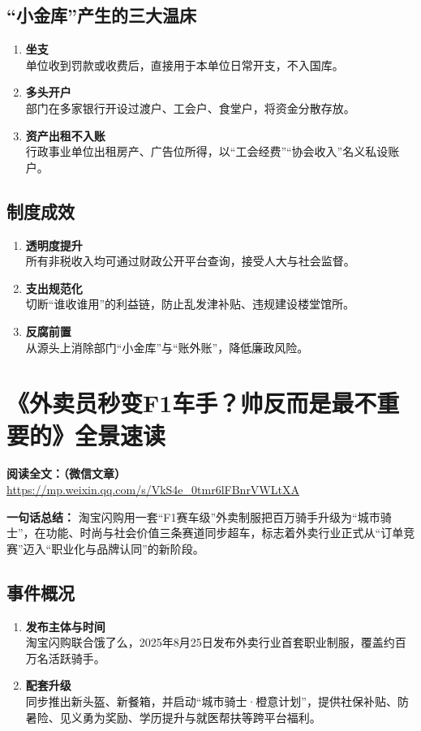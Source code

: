 \subsection{“小金库”产生的三大温床}
\begin{enumerate}[leftmargin=*, nosep]
    \item \textbf{坐支}  \\
    单位收到罚款或收费后，直接用于本单位日常开支，不入国库。
    \item \textbf{多头开户}  \\
    部门在多家银行开设过渡户、工会户、食堂户，将资金分散存放。
    \item \textbf{资产出租不入账}  \\
    行政事业单位出租房产、广告位所得，以“工会经费”“协会收入”名义私设账户。
\end{enumerate}

\subsection{制度成效}
\begin{enumerate}[leftmargin=*, nosep]
    \item \textbf{透明度提升}  \\
    所有非税收入均可通过财政公开平台查询，接受人大与社会监督。
    \item \textbf{支出规范化}  \\
    切断“谁收谁用”的利益链，防止乱发津补贴、违规建设楼堂馆所。
    \item \textbf{反腐前置}  \\
    从源头上消除部门“小金库”与“账外账”，降低廉政风险。
\end{enumerate}

\clearpage

\section{《外卖员秒变F1车手？帅反而是最不重要的》全景速读}
\vspace{1cm}
\noindent\textbf{阅读全文：（微信文章）} \url{https://mp.weixin.qq.com/s/VkS4e_0tmr6lFBnrVWLtXA}

\textbf{一句话总结：}  
淘宝闪购用一套“F1赛车级”外卖制服把百万骑手升级为“城市骑士”，在功能、时尚与社会价值三条赛道同步超车，标志着外卖行业正式从“订单竞赛”迈入“职业化与品牌认同”的新阶段。

\subsection{事件概况}
\begin{enumerate}[leftmargin=*, nosep]
    \item \textbf{发布主体与时间}  \\
    淘宝闪购联合饿了么，2025年8月25日发布外卖行业首套职业制服，覆盖约百万名活跃骑手。
    \item \textbf{配套升级}  \\
    同步推出新头盔、新餐箱，并启动“城市骑士·橙意计划”，提供社保补贴、防暑险、见义勇为奖励、学历提升与就医帮扶等跨平台福利。
\end{enumerate}

